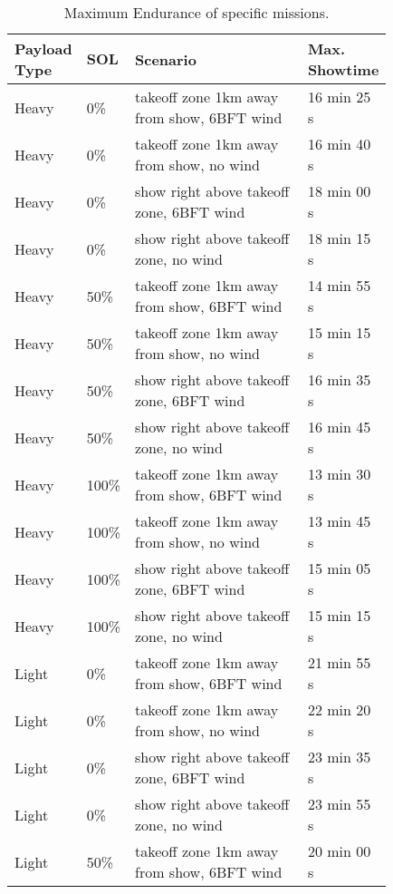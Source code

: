 \begin{table}[H]
    \caption{Maximum Endurance of specific missions.}
    \label{tab:max_end}
    \centering
    \begin{tabular}{p{0.10\linewidth}|p{0.05\linewidth}|p{0.50\linewidth}|p{0.18\linewidth}}
        \textbf{Payload Type} & $\mathbf{SOL}$ & \textbf{Scenario} & \textbf{Max. Showtime} \\ \hline \hline
        Heavy & 0\% & takeoff zone 1km away from show, 6BFT wind & 16 min 25 s \\ \hline
        Heavy & 0\% & takeoff zone 1km away from show, no wind & 16 min 40 s \\ \hline
        Heavy & 0\% & show right above takeoff zone, 6BFT wind & 18 min 00 s \\ \hline
        Heavy & 0\% & show right above takeoff zone, no wind & 18 min 15 s \\ \hline \hline
        Heavy & 50\% & takeoff zone 1km away from show, 6BFT wind & 14 min 55 s \\ \hline
        Heavy & 50\% & takeoff zone 1km away from show, no wind & 15 min 15 s \\ \hline
        Heavy & 50\% & show right above takeoff zone, 6BFT wind & 16 min 35 s \\ \hline
        Heavy & 50\% & show right above takeoff zone, no wind & 16 min 45 s \\ \hline \hline
        Heavy & 100\% & takeoff zone 1km away from show, 6BFT wind & 13 min 30 s \\ \hline
        Heavy & 100\% & takeoff zone 1km away from show, no wind & 13 min 45 s \\ \hline
        Heavy & 100\% & show right above takeoff zone, 6BFT wind & 15 min 05 s \\ \hline
        Heavy & 100\% & show right above takeoff zone, no wind & 15 min 15 s \\ \hline \hline
        Light & 0\% & takeoff zone 1km away from show, 6BFT wind & 21 min 55 s \\ \hline
        Light & 0\% & takeoff zone 1km away from show, no wind & 22 min 20 s \\ \hline
        Light & 0\% & show right above takeoff zone, 6BFT wind & 23 min 35 s \\ \hline
        Light & 0\% & show right above takeoff zone, no wind & 23 min 55 s \\ \hline \hline
        Light & 50\% & takeoff zone 1km away from show, 6BFT wind & 20 min 00 s \\ \hline

\end{tabular}
\end{table}
